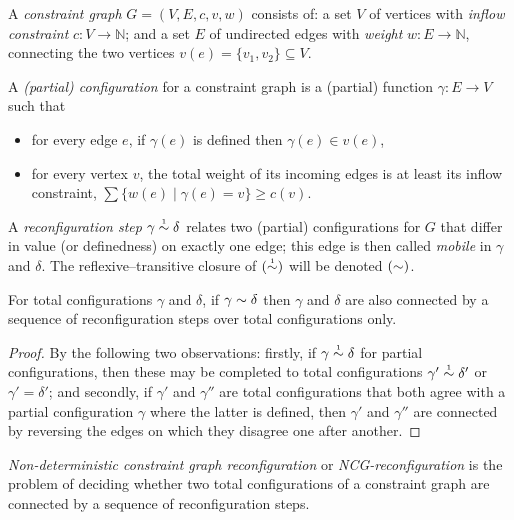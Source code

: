 \documentclass{lmcs}
\let\capsabbrev=\uppercase
\begin{document}
\begin{definition} 
A \emph{constraint graph} $G=(V,E,c,v,w)$ consists of: a set $V$ of vertices with \emph{inflow constraint} $c\colon V\to\mathbb N$; and a set $E$ of undirected edges with \emph{weight} $w\colon E\to\mathbb N$, connecting the two vertices $v(e)=\{v_1,v_2\}\subseteq V$.

\smallskip

A \emph{(partial) configuration} for a constraint graph is a (partial) function $\gamma\colon E\to V$ such that
\begin{itemize}
	\item
for every edge $e$, if $\gamma(e)$ is defined then $\gamma(e)\in v(e)$,
	\item
for every vertex $v$, the total weight of its incoming edges is at least its inflow constraint, 
$\sum\{w(e)\mid\gamma(e)=v\}\geq c(v)$.
\end{itemize} 

\smallskip
A \emph{reconfiguration step} $\gamma\perm*\delta$ relates two (partial) configurations for $G$ that differ in value (or definedness) on exactly one edge; this edge is then called \emph{mobile} in $\gamma$ and $\delta$.
%
The reflexive--transitive closure of $(\perm*)$ will be denoted $(\perm)$.
%
\end{definition}


\begin{proposition}
\label{prop:partial simulates total reconfiguration}
For total configurations $\gamma$ and $\delta$, if $\gamma\perm\delta$ then $\gamma$ and $\delta$ are also connected by a sequence of reconfiguration steps over total configurations only.
\end{proposition}


\begin{proof}
By the following two observations: firstly, 
%
if $\gamma\perm*\delta$ for partial configurations, then these may be completed to total configurations $\gamma'\perm*\delta'$ or $\gamma'=\delta'$; and secondly,
%
if $\gamma'$ and $\gamma''$ are total configurations that both agree with a partial configuration $\gamma$ where the latter is defined, then $\gamma'$ and $\gamma''$ are connected by reversing the edges on which they disagree one after another.
%
\end{proof}


\emph{Non-deterministic constraint graph reconfiguration} or \emph{\capsabbrev{ncg}-reconfiguration} is the problem of deciding whether two total configurations of a constraint graph are connected by a sequence of reconfiguration steps.
\end{document}

